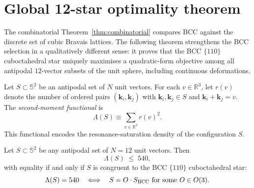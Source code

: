 \section{Global 12-star optimality
theorem}\label{sec:global12}

The combinatorial Theorem~\ref{thm:combinatorial} compares BCC against
the discrete set of cubic Bravais lattices. The following theorem
strengthens the BCC selection in a qualitatively different sense: it
proves that the BCC $\{110\}$ cuboctahedral star uniquely maximises a
quadratic-form objective among all antipodal $12$-vector subsets of
the unit sphere, including continuous deformations.

\begin{definition}
\label{def:Lambda}
Let $S \subset \mathbb{S}^2$ be an antipodal set of $N$ unit vectors.
For each $v \in \mathbb{R}^3$, let $r(v)$ denote the number of ordered
pairs $(\mathbf{k}_i, \mathbf{k}_j)$ with $\mathbf{k}_i, \mathbf{k}_j
\in S$ and $\mathbf{k}_i + \mathbf{k}_j = v$. The
\emph{second-moment functional} is
\begin{equation}
\Lambda(S) \equiv \sum_{v \in \mathbb{R}^3} r(v)^2.
\end{equation}
This functional encodes the resonance-saturation density of the
configuration $S$.
\end{definition}

\begin{theorem}
\label{thm:global12}
Let $S \subset \mathbb{S}^2$ be any antipodal set of $N = 12$ unit
vectors. Then
\begin{equation}
\Lambda(S) \;\leq\; 540,
\end{equation}
with equality if and only if $S$ is congruent to the BCC $\{110\}$
cuboctahedral star:
\begin{equation}
\Lambda(S) = 540
\quad\Longleftrightarrow\quad
S = O \cdot S_{\rm BCC} \text{ for some } O \in O(3).
\end{equation}
\end{theorem}

